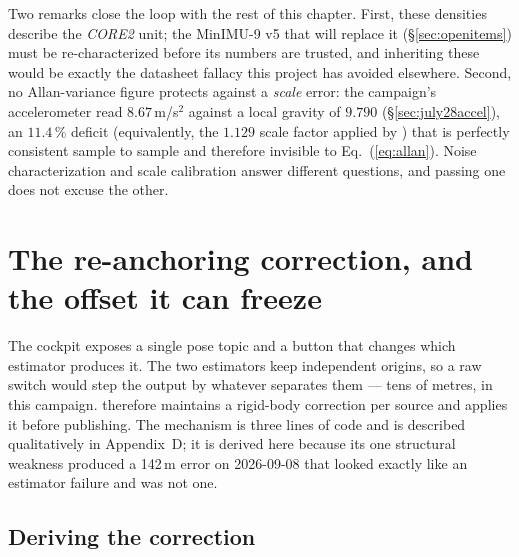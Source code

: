 \noindent Two remarks close the loop with the rest of this chapter. First,
these densities describe the \emph{CORE2} unit; the MinIMU-9 v5 that will
replace it (\S\ref{sec:openitems}) must be re-characterized before its
numbers are trusted, and inheriting these would be exactly the datasheet
fallacy this project has avoided elsewhere. Second, no Allan-variance figure
protects against a \emph{scale} error: the campaign's accelerometer read
$8.67$\,m/s$^2$ against a local gravity of $9.790$
(\S\ref{sec:july28accel}), an $11.4\,\%$ deficit (equivalently, the $1.129$ scale factor
applied by ) that is perfectly consistent
sample to sample and therefore invisible to Eq.~(\ref{eq:allan}). Noise
characterization and scale calibration answer different questions, and
passing one does not excuse the other.

\section{The re-anchoring correction, and the offset it can freeze}
\label{sec:se3corr}

The cockpit exposes a single pose topic and a button that changes which
estimator produces it. The two estimators keep independent origins, so a
raw switch would step the output by whatever separates them --- tens of
metres, in this campaign.  therefore maintains a
rigid-body correction per source and applies it before publishing. The
mechanism is three lines of code and is described qualitatively in
Appendix~D; it is derived here because its one structural weakness produced
a 142\,m error on 2026-09-08 that looked exactly like an estimator failure
and was not one.

\subsection{Deriving the correction}
\label{sec:corrderiv}

